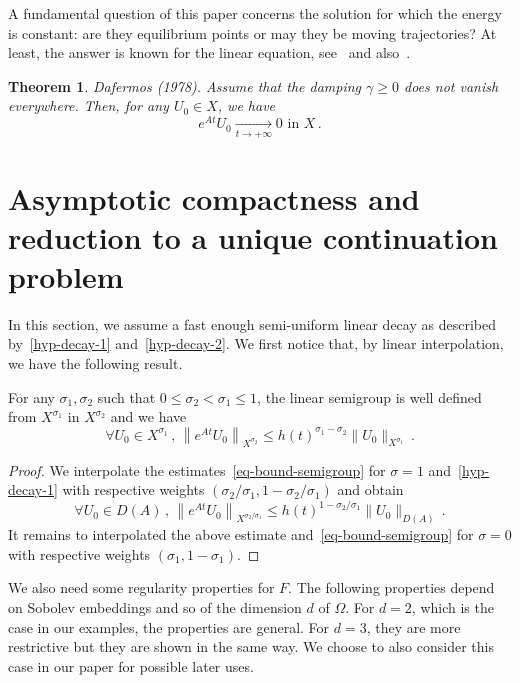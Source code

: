 \documentclass[10pt]{amsart}
\newtheorem{theo}{Theorem}[section]
\theoremstyle{definition}\newtheorem{defi}[theo]{Definition}\newtheorem{rema}[theo]{Remark}\newtheorem{exam}[theo]{Example}\newtheorem{exem}[theo]{Example}\newtheorem{nota}[theo]{Notation}
\let\oldforall\forall
\renewcommand*{\forall}{\mathrel{\oldforall}}
\begin{document}
A fundamental question of this paper concerns the solution for which the energy is constant: are they equilibrium points or may they be moving trajectories? At least, the answer is known for the linear equation, see~\cite{Dafermos} and also~\cite{Haraux}.

\begin{theo}\label{th-stab-linear}
\emph{Dafermos (1978).}
Assume that the damping $\gamma\geq 0$ does not vanish everywhere. Then, for any $U_0\in X$, we have
\[
e^{At}U_0\xrightarrow[t\longrightarrow +\infty]{} 0\text{ in }X\,.
\]
\end{theo}



\section{Asymptotic compactness and reduction to a unique continuation problem}\label{section-asymp-compact}

In this section, we assume a fast enough semi-uniform linear decay as described by~\eqref{hyp-decay-1} and~\eqref{hyp-decay-2}. We first notice that, by linear interpolation, we have the following result.

\begin{prop}\label{prop-decay-interpole}
For any $\sigma_1,\sigma_2$ such that $0\leq \sigma_2<\sigma_1 \leq 1$, the linear semigroup is well defined from $X^{\sigma_1}$ in $X^{\sigma_2}$ and we have
\[
\forall U_0\in X^{\sigma_1}\,,\,\left\|e^{At}U_0\right\|_{X^{\sigma_2}} \leq
h(t)^{\sigma_1-\sigma_2} \|U_0\|_{X^{\sigma_1}}\,.
\]
\end{prop}
\begin{proof}
We interpolate the estimates~\eqref{eq-bound-semigroup} for $\sigma=1$ and~\eqref{hyp-decay-1} with respective weights $(\sigma_2/\sigma_1,1-\sigma_2/\sigma_1)$ and obtain
\[
\forall U_0\in D(A)\,,\,\left\|e^{At}U_0\right\|_{X^{\sigma_2/\sigma_1}} \leq
h(t)^{1-\sigma_2/\sigma_1}\|U_0\|_{D(A)}\,.
\]
It remains to interpolated the above estimate and~\eqref{eq-bound-semigroup} for $\sigma=0$ with respective weights $(\sigma_1,1-\sigma_1)$.
\end{proof}



We also need some regularity properties for $F$. The following properties depend on Sobolev embeddings and so of the dimension $d$ of $\Omega$. For $d=2$, which is the case in our examples, the properties are general. For $d=3$, they are more restrictive but they are shown in the same way. We choose to also consider this case in our paper for possible later uses.
\end{document}
